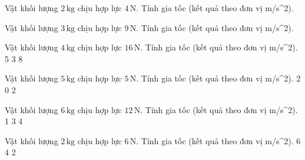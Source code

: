\begin{bt}
Vật khối lượng $2\,\text{kg}$ chịu hợp lực $4\,\text{N}$. Tính gia tốc (kết quả theo đơn vị m/s^2).
\end{bt}

\begin{bt}
Vật khối lượng $3\,\text{kg}$ chịu hợp lực $9\,\text{N}$. Tính gia tốc (kết quả theo đơn vị m/s^2).
\end{bt}

\begin{ex}
Vật khối lượng $4\,\text{kg}$ chịu hợp lực $16\,\text{N}$. Tính gia tốc (kết quả theo đơn vị m/s^2).
\choice
{}
{5}
{3}
{8}
\end{ex}

\begin{ex}
Vật khối lượng $5\,\text{kg}$ chịu hợp lực $5\,\text{N}$. Tính gia tốc (kết quả theo đơn vị m/s^2).
\choice
{2}
{}
{0}
{2}
\end{ex}

\begin{ex}
Vật khối lượng $6\,\text{kg}$ chịu hợp lực $12\,\text{N}$. Tính gia tốc (kết quả theo đơn vị m/s^2).
\choice
{1}
{3}
{}
{4}
\end{ex}

\begin{ex}
Vật khối lượng $2\,\text{kg}$ chịu hợp lực $6\,\text{N}$. Tính gia tốc (kết quả theo đơn vị m/s^2).
\choice
{6}
{4}
{2}
{}
\end{ex}

